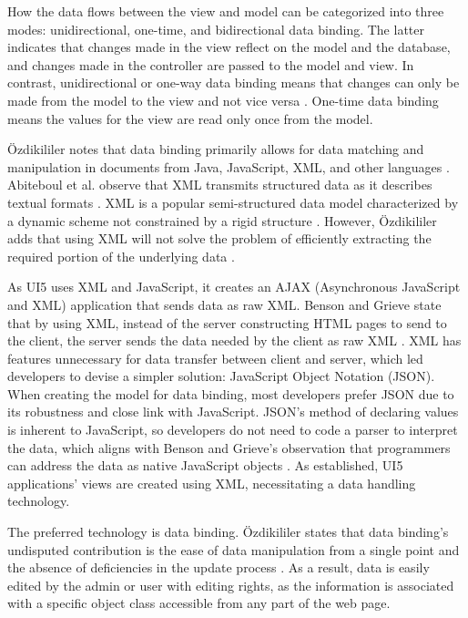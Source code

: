 \documentclass{article}
\begin{document}
How the data flows between the view and model can be categorized into three modes: unidirectional, one-time, and bidirectional data binding. The latter indicates that changes made in the view reflect on the model and the database, and changes made in the controller are passed to the model and view. In contrast, unidirectional or one-way data binding means that changes can only be made from the model to the view and not vice versa \parencite{SAP2024c}. One-time data binding means the values for the view are read only once from the model.

Özdikililer notes that data binding primarily allows for data matching and manipulation in documents from Java, JavaScript, XML, and other languages \parencite{Ozdikililer2021}. Abiteboul et al. observe that XML transmits structured data as it describes textual formats \parencite{Abiteboul2000}. XML is a popular semi-structured data model characterized by a dynamic scheme not constrained by a rigid structure \parencite{ElDahshan2022}. However, Özdikililer adds that using XML will not solve the problem of efficiently extracting the required portion of the underlying data \parencite{Ozdikililer2021}.

As UI5 uses XML and JavaScript, it creates an AJAX (Asynchronous JavaScript and XML) application that sends data as raw XML. Benson and Grieve state that by using XML, instead of the server constructing HTML pages to send to the client, the server sends the data needed by the client as raw XML \parencite{Benson2021}. XML has features unnecessary for data transfer between client and server, which led developers to devise a simpler solution: JavaScript Object Notation (JSON). When creating the model for data binding, most developers prefer JSON due to its robustness and close link with JavaScript. JSON’s method of declaring values is inherent to JavaScript, so developers do not need to code a parser to interpret the data, which aligns with Benson and Grieve’s observation that programmers can address the data as native JavaScript objects \parencite{Benson2021}. As established, UI5 applications’ views are created using XML, necessitating a data handling technology.

The preferred technology is data binding. Özdikililer states that data binding’s undisputed contribution is the ease of data manipulation from a single point and the absence of deficiencies in the update process \parencite{Ozdikililer2021}. As a result, data is easily edited by the admin or user with editing rights, as the information is associated with a specific object class accessible from any part of the web page.
\end{document}
